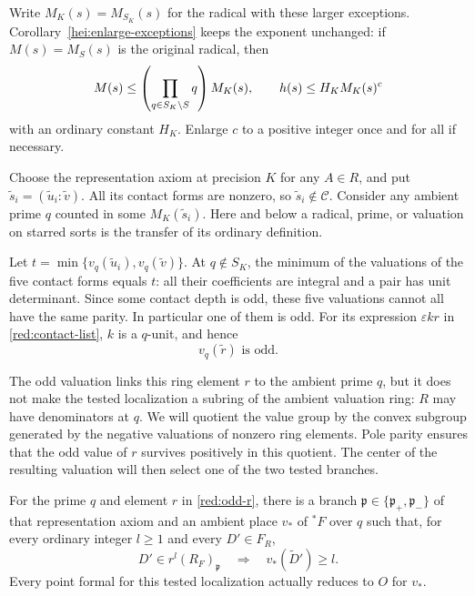Write \(M_K(s)=M_{S_K}(s)\) for the radical with these larger
exceptions. Corollary~\ref{hei:enlarge-exceptions} keeps the exponent
unchanged: if \(M(s)=M_S(s)\) is the original radical, then
\[
 M(s)\le\left(\prod_{q\in S_K\setminus S}q\right)M_K(s),
 \qquad h(s)\le H_K M_K(s)^c
\]
with an ordinary constant $H_K$. Enlarge $c$ to a positive integer
once and for all if necessary.

Choose the representation axiom at precision $K$ for any $A\in R$,
and put $\widetilde s_i=(\widetilde u_i:\widetilde v)$.
All its contact forms are nonzero, so
$\widetilde s_i\notin\mathcal C$. Consider any ambient prime $q$
counted in some $M_K(\widetilde s_i)$. Here and below a radical, prime,
or valuation on starred sorts is the transfer of its ordinary definition.

Let $t=\min\{v_q(\widetilde u_i),v_q(\widetilde v)\}$.
At $q\notin S_K$, the minimum of the valuations of the five contact
forms equals $t$: all their coefficients are integral and a pair has
unit determinant. Since some contact depth is odd, these five
valuations cannot all have the same parity. In particular one of them
is odd. For its expression $\varepsilon k r$ in
\eqref{red:contact-list}, $k$ is a $q$-unit, and hence
\begin{equation}\label{red:odd-r}
                            v_q(\widetilde r)\text{ is odd}.
\end{equation}

The odd valuation links this ring element \(r\) to the ambient
prime \(q\), but it does not make the tested localization a subring of
the ambient valuation ring: \(R\) may have denominators at \(q\).
We will quotient the value group by the convex subgroup generated by
the negative valuations of nonzero ring elements. Pole parity ensures
that the odd value of \(r\) survives positively in this quotient. The
center of the resulting valuation will then select one of the two
tested branches.

\begin{lemma}\label{red:coarsening}
For the prime $q$ and element $r$ in \eqref{red:odd-r}, there is a
branch $\mathfrak p\in\{\mathfrak p_+,\mathfrak p_-\}$ of that
representation axiom and an ambient place $v_*$ of ${}^*F$ over $q$
such that, for every ordinary integer $l\ge1$ and every $D'\in F_R$,
\begin{equation}\label{red:valuation-transfer}
 D'\in r^l(R_F)_{\mathfrak p}
               \quad\Longrightarrow\quad v_*(\widetilde D')\ge l.
\end{equation}
Every point formal for this tested localization actually reduces to
$O$ for $v_*$.
\end{lemma}

